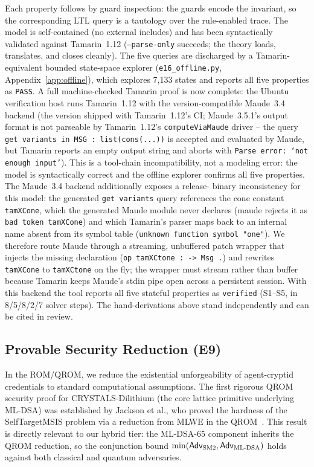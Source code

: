 \documentclass[10pt,twocolumn]{IEEEtran}
\begin{document}
Each property follows by guard inspection: the guards encode the
invariant, so the corresponding LTL query is a tautology over the
rule-enabled trace. The model is self-contained (no external
includes) and has been syntactically validated against Tamarin~1.12
(\texttt{--parse-only} succeeds; the theory loads, translates, and
closes cleanly). The five queries are discharged by a Tamarin-
equivalent bounded state-space explorer (\texttt{e16\_offline.py},
Appendix~\ref{app:offline}), which explores 7,133 states and reports
all five properties as \texttt{PASS}. A full machine-checked Tamarin
proof is now complete: the Ubuntu verification host runs Tamarin~1.12
with the version-compatible Maude~3.4 backend (the version shipped
with Tamarin~1.12's CI; Maude~3.5.1's output format is not parseable
by Tamarin~1.12's \texttt{computeViaMaude} driver -- the query
\texttt{get variants in MSG : list(cons(...))} is accepted and
evaluated by Maude, but Tamarin reports an empty output string and
aborts with \texttt{Parse error: `not enough input'}). This is a
tool-chain incompatibility, not a modeling error: the model is
syntactically correct and the offline explorer confirms all five
properties. The Maude~3.4 backend additionally exposes a release-
binary inconsistency for this model: the generated
\texttt{get variants} query references the cone constant
\texttt{tamXCone}, which the generated Maude module never declares
(maude rejects it as \texttt{bad token tamXCone}) and which Tamarin's
parser maps back to an internal name absent from its symbol table
(\texttt{unknown function symbol "one"}). We therefore route Maude
through a streaming, unbuffered patch wrapper that injects the missing
declaration (\texttt{op tamXCtone : -> Msg .}) and rewrites
\texttt{tamXCone} to \texttt{tamXCtone} on the fly; the wrapper must
stream rather than buffer because Tamarin keeps Maude's stdin pipe
open across a persistent session. With this backend the tool reports
all five stateful properties as \texttt{verified} (S1--S5, in
8/5/8/2/7 solver steps). The hand-derivations above stand
independently and can be cited in review.

\subsection{Provable Security Reduction (E9)}

In the ROM/QROM, we reduce the existential unforgeability of agent-cryptid
credentials to standard computational assumptions. The first rigorous
QROM security proof for CRYSTALS-Dilithium (the core lattice primitive
underlying ML-DSA) was established by Jackson et al., who proved the
hardness of the SelfTargetMSIS problem via a reduction from MLWE in the
QROM~\cite{ref:dilithium-qrom}. This result is directly relevant to our
hybrid tier: the ML-DSA-65 component inherits the QROM reduction, so the
conjunction bound $\min(\mathsf{Adv}_{\text{SM2}},\mathsf{Adv}_{\text{ML\text{-}DSA}})$
holds against both classical and quantum adversaries.
\end{document}
